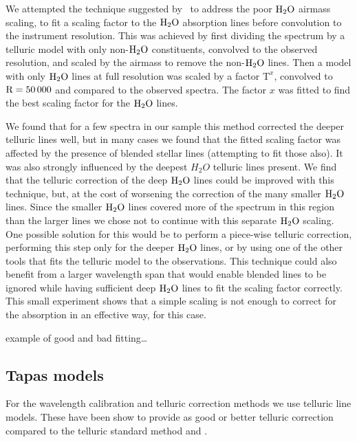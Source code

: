 We attempted the technique suggested by~\citet{bertaux_tapas_2014} to address the poor \(\rm H_{2}O \) airmass scaling, to fit a scaling factor to the \(\rm {H}_{2}O \) absorption lines before convolution to the instrument resolution. This was achieved by first dividing the spectrum by a telluric model with only non-\(\rm H_{2}O \) constituents, convolved to the observed resolution, and scaled by the airmass to remove the non-\(\rm H_{2}O \) lines. Then a model with only \(\rm H_{2}O \) lines at full resolution was scaled by a factor \(\textrm{T}^{x} \), convolved to \(\rm R=50\,000 \) and compared to the observed spectra. The factor \(x \) was fitted to find the best scaling factor for the \(\rm H_{2}O \) lines.

We found that for a few spectra in our sample this method corrected the deeper telluric lines well, but in many cases we found that the fitted scaling factor was affected by the presence of blended stellar lines (attempting to fit those also). It was also strongly influenced by the deepest \(H_{2}O\) telluric lines present. We find that the telluric correction of the deep \(\rm H_{2}O \) lines could be improved with this technique, but, at the cost of worsening the correction of the many smaller \(\rm H_{2}O \) lines. Since the smaller \(\rm H_{2}O \) lines covered more of the spectrum in this region than the larger lines we chose not to continue with this separate \(\rm H_{2}O \) scaling. One possible solution for this would be to perform a piece-wise telluric correction, performing this step only for the deeper \( \rm H_{2}O\) lines, or by using one of the other tools that fits the telluric model to the observations. This technique could also benefit from a larger wavelength span that would enable blended lines to be ignored while having sufficient deep \(\rm H_{2}O\) lines to fit the scaling factor correctly. This small experiment shows that a simple scaling is not enough to correct for the absorption in an effective way, for this case.



 example of good and bad fitting\ldots


\subsection{Tapas models}
\label{subsec:tapas_models}
For the wavelength calibration and telluric correction methods we use telluric line models. These have been show to provide as good or better telluric correction compared to the telluric standard method and \citep{ulmer-moll_telluric_2018}.

